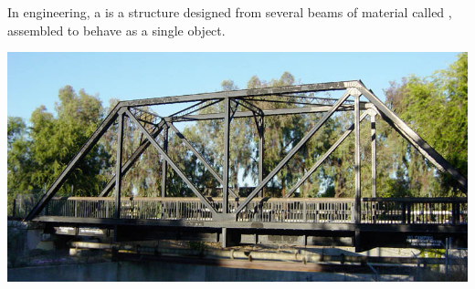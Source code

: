 \newcommand{\drawtruss}[2][1]{%
\begin{center}
\begin{tikzpicture}[scale=#1, every node/.style={scale=#1}]
\draw (0,0) node[left,magenta]{C} -- 
      (1,1.71) node[left,magenta]{A} -- 
      (2,0) node[above,magenta]{D} -- cycle;
\draw (2,0) -- 
      (3,1.71) node[right,magenta]{B} -- 
      (1,1.71) -- cycle;
\draw (3,1.71) -- (4,0) node[right,magenta]{E} -- (2,0) -- cycle;
\draw[blue] (0,0) -- (0.25,-0.425) -- (-0.25,-0.425) -- cycle;
\draw[blue] (4,0) -- (4.25,-0.425) -- (3.75,-0.425) -- cycle;
\draw[thick,red,->] (2,0) -- (2,-0.75);
#2
\end{tikzpicture}
\end{center}
}
\newcommand{\trussNormalForces}{%
\draw [thick, blue,->] (0,0) -- (0.5,0.5);
\draw [thick, blue,->] (4,0) -- (3.5,0.5);
}
\newcommand{\trussCompletion}{%
\trussNormalForces
\draw [thick, magenta,<->] (0.4,0.684) -- (0.6,1.026);
\draw [thick, magenta,<->] (3.4,1.026) -- (3.6,0.684);
\draw [thick, magenta,<->] (1.8,1.71) -- (2.2,1.71);
\draw [thick, magenta,->] (1.6,0.684) -- (1.5,0.855);
\draw [thick, magenta,<-] (1.5,0.855) -- (1.4,1.026);
\draw [thick, magenta,->] (2.4,0.684) -- (2.5,0.855);
\draw [thick, magenta,<-] (2.5,0.855) -- (2.6,1.026);
}
\newcommand{\trussCForces}{%
\draw [thick, blue,->] (0,0) -- (0.5,0.5);
\draw [thick, magenta,->] (0,0) -- (0.4,0.684);
\draw [thick, magenta,->] (0,0) -- (0.5,0);
}
\newcommand{\trussStrutVariables}{%
\node[above] at (2,1.71) {\(x_1\)};
\node[left] at (0.5,0.866) {\(x_2\)};
\node[left] at (1.5,0.866) {\(x_3\)};
\node[right] at (2.5,0.866) {\(x_4\)};
\node[right] at (3.5,0.866) {\(x_5\)};
\node[below] at (1,0) {\(x_6\)};
\node[below] at (3,0) {\(x_7\)};
}


\begin{example}
In engineering, a  is a structure designed from several beams
of material called , assembled to behave as a single object.

\begin{center}
\includegraphics[width=0.8\linewidth]{media/truss.jpg}
\end{center}
\end{example}

